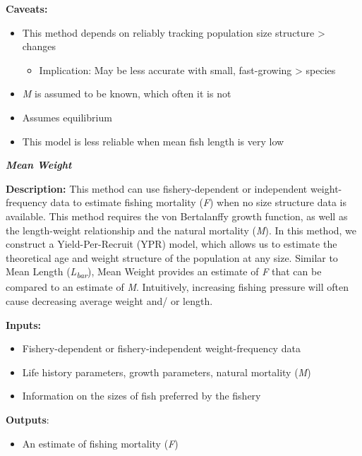 \documentclass[]{book}
\providecommand{\tightlist}{%
  \setlength{\itemsep}{0pt}\setlength{\parskip}{0pt}}
\begin{document}
\textbf{Caveats: }

\begin{itemize}
\item
  This method depends on reliably tracking population size structure
  \textgreater{} changes

  \begin{itemize}
  \tightlist
  \item
    Implication: May be less accurate with small, fast-growing
    \textgreater{} species
  \end{itemize}
\item
  \emph{M} is assumed to be known, which often it is not
\item
  Assumes equilibrium
\item
  This model is less reliable when mean fish length is very low
\end{itemize}

\textbf{\emph{Mean Weight}}

\textbf{Description:} This method can use fishery-dependent or
independent weight-frequency data to estimate fishing mortality
(\emph{F}) when no size structure data is available. This method
requires the von Bertalanffy growth function, as well as the
length-weight relationship and the natural mortality (\emph{M}). In this
method, we construct a Yield-Per-Recruit (YPR) model, which allows us to
estimate the theoretical age and weight structure of the population at
any size. Similar to Mean Length (\emph{L\textsubscript{bar}}), Mean
Weight provides an estimate of \emph{F} that can be compared to an
estimate of \emph{M}. Intuitively, increasing fishing pressure will
often cause decreasing average weight and/ or length.

\textbf{Inputs: }

\begin{itemize}
\item
  Fishery-dependent or fishery-independent weight-frequency data
\item
  Life history parameters, growth parameters, natural mortality
  (\emph{M})
\item
  Information on the sizes of fish preferred by the fishery
\end{itemize}

\textbf{Outputs}:

\begin{itemize}
\tightlist
\item
  An estimate of fishing mortality (\emph{F})
\end{itemize}
\end{document}
